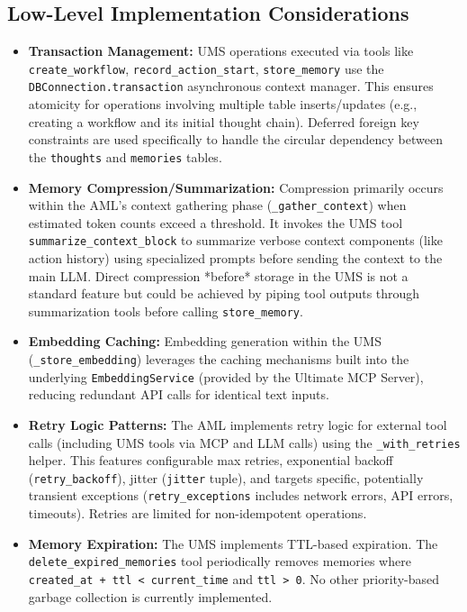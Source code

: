 \documentclass[12pt,a4paper]{article}
\newcommand{\code}[1]{\nolinkurl{#1}}
\begin{document}
\subsection{Low-Level Implementation Considerations}
\begin{itemize}
    \item \textbf{Transaction Management:} UMS operations executed via tools like \code{create\_workflow}, \code{record\_action\_start}, \code{store\_memory} use the \code{DBConnection.transaction} asynchronous context manager. This ensures atomicity for operations involving multiple table inserts/updates (e.g., creating a workflow and its initial thought chain). Deferred foreign key constraints are used specifically to handle the circular dependency between the \code{thoughts} and \code{memories} tables.

    \item \textbf{Memory Compression/Summarization:} Compression primarily occurs within the AML's context gathering phase (\code{\_gather\_context}) when estimated token counts exceed a threshold. It invokes the UMS tool \code{summarize\_context\_block} to summarize verbose context components (like action history) using specialized prompts before sending the context to the main LLM. Direct compression *before* storage in the UMS is not a standard feature but could be achieved by piping tool outputs through summarization tools before calling \code{store\_memory}.

    \item \textbf{Embedding Caching:} Embedding generation within the UMS (\code{\_store\_embedding}) leverages the caching mechanisms built into the underlying \code{EmbeddingService} (provided by the Ultimate MCP Server), reducing redundant API calls for identical text inputs.

    \item \textbf{Retry Logic Patterns:} The AML implements retry logic for external tool calls (including UMS tools via MCP and LLM calls) using the \code{\_with\_retries} helper. This features configurable max retries, exponential backoff (\code{retry\_backoff}), jitter (\code{jitter} tuple), and targets specific, potentially transient exceptions (\code{retry\_exceptions} includes network errors, API errors, timeouts). Retries are limited for non-idempotent operations.

    \item \textbf{Memory Expiration:} The UMS implements TTL-based expiration. The \code{delete\_expired\_memories} tool periodically removes memories where \code{created\_at + ttl < current\_time} and \code{ttl > 0}. No other priority-based garbage collection is currently implemented.
\end{itemize}
\end{document}
